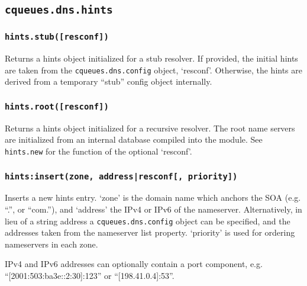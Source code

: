 \documentclass[11pt, oneside]{memoir}
\newcommand{\fn}[1]{\texttt{#1} }
\newcommand{\module}[1]{\texttt{#1} }
\newcounter{toccols}
\newenvironment{Module}[1]{
	\subsection{\texttt{#1}}
	\addtocontents{toc}{
		\protect\begin{multicols}{\value{toccols}}
	}
}{
	\addtocontents{toc}{\protect\end{multicols}}
}
\begin{document}
\begin{Module}{cqueues.dns.hints}
\subsubsection[\fn{hints.stub}]{\fn{hints.stub([resconf])}}

Returns a hints object initialized for a stub resolver. If provided, the initial hints are taken from the \module{cqueues.dns.config} object,  `resconf'. Otherwise, the hints are derived from a temporary ``stub'' config object internally.

\subsubsection[\fn{hints.root}]{\fn{hints.root([resconf])}}

Returns a hints object initialized for a recursive resolver. The root name servers are initialized from an internal database compiled into the module. See \fn{hints.new} for the function of the optional `resconf'.

\subsubsection[\fn{hints:insert}]{\fn{hints:insert(zone, address|resconf[, priority])}}

Inserts a new hints entry. `zone' is the domain name which anchors the SOA (e.g. ``.'', or ``com.''), and `address' the IPv4 or IPv6 of the nameserver. Alternatively, in lieu of a string address a \module{cqueues.dns.config} object can be specified, and the addresses taken from the nameserver list property. `priority' is used for ordering  nameservers in each zone.

IPv4 and IPv6 addresses can optionally contain a port component, e.g. ``[2001:503:ba3e::2:30]:123'' or ``[198.41.0.4]:53''.

\end{Module}
\end{document}
